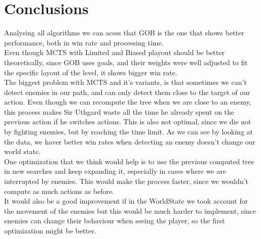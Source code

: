 \documentclass{article}
\begin{document}
  \section{Conclusions}
  Analysing all algorithms we can acess that GOB is the one that shows better performance, both in win rate and processing time.\\
  Even though MCTS with Limited and Biased playout should be better theoretically, since GOB uses goals, and their weights were well adjusted to fit the 
  specific layout of the level, it shows bigger win rate.\\
  The biggest problem with MCTS and it's variants, is that sometimes we can't detect enemies in our path, and can only detect them close to the target of our action.
  Even though we can recompute the tree when we are close to an enemy, this process makes Sir Uthgard waste all the time he already spent on the previous action if he switches
  actions. This is also not optimal, since we die not by fighting enemies, but by reaching the time limit. As we can see by looking at the data,
  we haver better win rates when detecting an enemy doesn't change our world state. \\
  One optimization that we think would help is to use the previous computed tree in new searches and keep expanding it, especially in cases where we are interrupted by enemies. 
  This would make the process faster, since we wouldn't compute as much actions as before.\\
  It would also be a good improvement if in the WorldState we took account for the movement of the enemies but this would be much harder to implement, since enemies can
  change their behaviour when seeing the player, so the first optimization might be better.
\end{document}
